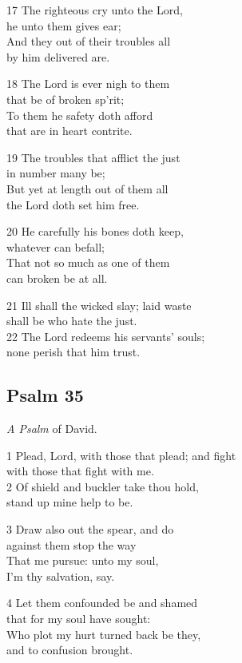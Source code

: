 \begin{multicols}{3}
17 The righteous cry unto the Lord,\\
he unto them gives ear;\\
And they out of their troubles all\\
by him delivered are.

18 The Lord is ever nigh to them\\
that be of broken sp’rit;\\
To them he safety doth afford\\
that are in heart contrite.

19 The troubles that afflict the just\\
in number many be;\\
But yet at length out of them all\\
the Lord doth set him free.

20 He carefully his bones doth keep,\\
whatever can befall;\\
That not so much as one of them\\
can broken be at all.

21 Ill shall the wicked slay; laid waste\\
shall be who hate the just.\\
22 The Lord redeems his servants’ souls;\\
none perish that him trust.

\begin{center}
\quad{}\quad{}
\end{center}

\subsection*{Psalm 35}

\emph{A Psalm} of David.

1 Plead, Lord, with those that plead; and fight\\
with those that fight with me.\\
2 Of shield and buckler take thou hold,\\
stand up mine help to be.

3 Draw also out the spear, and do\\
against them stop the way\\
That me pursue: unto my soul,\\
I’m thy salvation, say.

4 Let them confounded be and shamed\\
that for my soul have sought:\\
Who plot my hurt turned back be they,\\
and to confusion brought.


\end{multicols}
